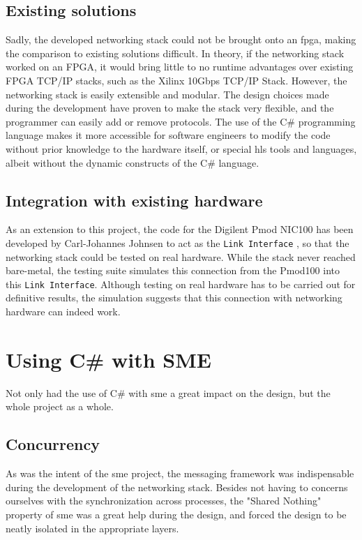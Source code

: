 \subsection{Existing solutions}
Sadly, the developed networking stack could not be brought onto an \gls{fpga},
making the comparison to existing solutions difficult.
In theory, if the networking stack worked on an FPGA, it would bring little to
no runtime advantages over existing FPGA TCP/IP stacks, such as the
Xilinx 10Gbps TCP/IP Stack\cite{sidler2016lowlatencytcp}.
However, the networking stack is easily extensible and modular. The design
choices made during the development have proven to make the stack very flexible,
and the programmer can easily add or remove protocols. The use of the C\#
programming language makes it more accessible for software engineers to modify
the code without prior knowledge to the hardware itself, or special \gls{hls}
tools and languages, albeit without the dynamic constructs of the C\# language.


\subsection{Integration with existing hardware}
As an extension to this project, the code for the Digilent Pmod NIC100\cite{pmod_nic100}
has been developed by Carl-Johannes Johnsen to act as the \texttt{Link Interface}
\cite{carl_pmod_nic100}, so that the networking stack could be tested on real
hardware.
While the stack never reached bare-metal, the testing suite simulates this
connection from the Pmod100 into this \texttt{Link Interface}. Although testing
on real hardware has to be carried out for definitive results, the simulation
suggests that this connection with networking hardware can indeed work.


\section{Using C\# with SME}
Not only had the use of C\# with \gls{sme} a great impact on the design, but the
whole project as a whole.

\subsection{Concurrency}
As was the intent of the \gls{sme} project, the messaging framework was
indispensable during the development of the networking stack. Besides not
having to concerns ourselves with the synchronization across processes, the
"Shared Nothing" property of \gls{sme} was a great help during the design, and
forced the design to be neatly isolated in the appropriate layers.

